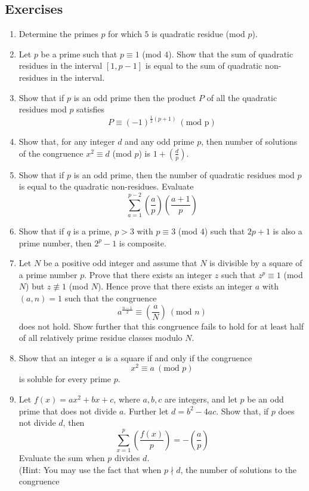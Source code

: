 \subsection{Exercises}
\begin{enumerate}
\item Determine the primes $p$ for which $5$ is  quadratic residue (mod $p$).
\item Let $p$ be a prime such that $p \equiv 1$ (mod $4$). Show that the sum of quadratic residues in the interval $[1,p-1]$ is equal to the sum of quadratic non-residues in the interval.
\item Show that if $p$ is an odd prime then the product $P$ of all the quadratic residues mod $p$ satisfies
    $$P \equiv (-1)^{\frac{1}{2} (p+1)}~(\text{mod p})$$
\item Show that, for any integer $d$ and any odd prime $p$, then number of solutions of the congruence $x^2 \equiv d$ (mod $p$) is $1+(\frac{d}{p})$.
\item Show that if $p$ is an odd prime, then the number of quadratic residues mod $p$ is equal to the quadratic non-residues. Evaluate
    $$\sum_{a=1}^{p-2}\left(\frac{a}{p}\right)\left(\frac{a+1}{p}\right)$$
\item Show that if $q$ is a prime, $p>3$ with $p \equiv 3$ (mod $4$) such that $2p+1$ is also a prime number, then $2^p-1$ is composite.
\item Let $N$ be a positive odd integer and assume that $N$ is divisible by a square of a prime number $p$. Prove that there exists an integer $z$ such that $z^p \equiv 1$ (mod $N$) but $z \not \equiv 1$ (mod $N$). Hence prove that there exists an integer $a$ with $(a,n)=1$ such that the congruence
    $$a^{\frac{n-1}{2}} \equiv \left(\frac{a}{N}\right)~(\text{mod } n)$$
    does not hold. Show further that this congruence fails to hold for at least half of all
    relatively prime residue classes modulo $N$.
\item Show that an integer $a$ is a square if and only if the congruence
     $$x^2 \equiv a~(\text{mod } p)$$
     is soluble for every prime $p$.
\item Let $f(x)=ax^2+bx+c$, where $a,b,c$ are integers, and let $p$ be an odd prime that does not divide $a$. Further let $d=b^2-4ac$. Show that, if $p$ does not divide $d$, then
    $$\sum_{x=1}^{p} \left(\frac{f(x)}{p}\right)=-\left(\frac{a}{p}\right)$$
    Evaluate the sum when $p$ divides $d$.\\
    (Hint: You may use the fact that when $p \nmid d$, the number of solutions to the congruence

\end{enumerate}
